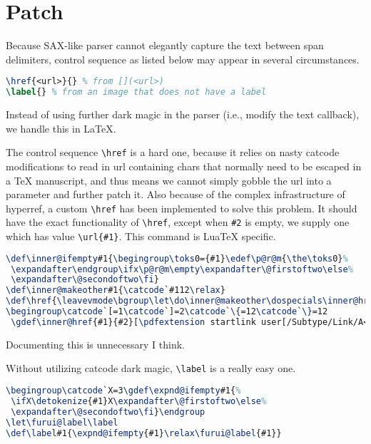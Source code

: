 \section{Patch}
Because SAX-like parser cannot elegantly capture the text between span delimiters, control sequence as listed below may appear in several circumstances.\par
\begin{lstlisting}[language=TeX]
\href{<url>}{} % from [](<url>)
\label{} % from an image that does not have a label
\end{lstlisting}
Instead of using further dark magic in the parser (i.e., modify the text callback), we handle this in LaTeX.\par
The control sequence \verb!\href! is a hard one, because it relies on nasty catcode modifications to read in url containing chars that normally need to be escaped in a TeX manuscript, and thus means we cannot simply gobble the url into a parameter and further patch it.
Also because of the complex infrastructure of hyperref, a custom \verb!\href! has been implemented to solve this problem. It should have the exact functionality of \verb!\href!, except when \verb!#2! is empty, we supply one which has value \verb!\url{#1}!.
This command is LuaTeX specific.\par
\begin{lstlisting}[language=TeX]
\def\inner@ifempty#1{\begingroup\toks0={#1}\edef\p@r@m{\the\toks0}%
 \expandafter\endgroup\ifx\p@r@m\empty\expandafter\@firstoftwo\else%
 \expandafter\@secondoftwo\fi}
\def\inner@makeother#1{\catcode`#112\relax}
\def\href{\leavevmode\bgroup\let\do\inner@makeother\dospecials\inner@href}
\begingroup\catcode`[=1\catcode`]=2\catcode`\{=12\catcode`\}=12
 \gdef\inner@href{#1}{#2}[\pdfextension startlink user[/Subtype/Link/A<</Type/Action/S/URI/URI(#1)>>] \inner@ifempty[#2][\url[#1]][#2] \pdfextension endlink \egroup]\endgroup
\end{lstlisting}
Documenting this is unnecessary I think.\par
Without utilizing catcode dark magic, \verb!\label! is a really easy one.\par
\begin{lstlisting}[language=TeX]
\begingroup\catcode`X=3\gdef\expnd@ifempty#1{%
 \ifX\detokenize{#1}X\expandafter\@firstoftwo\else%
 \expandafter\@secondoftwo\fi}\endgroup
\let\furui@label\label
\def\label#1{\expnd@ifempty{#1}\relax\furui@label{#1}}
\end{lstlisting}
